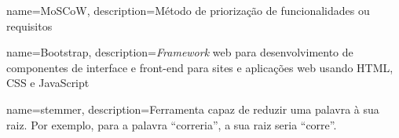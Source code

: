 
{
   name=MoSCoW,
   description={Método de priorização de funcionalidades ou requisitos }
}

{
    name=Bootstrap,
    description={\textit{Framework} web para desenvolvimento de componentes de interface e front-end para sites e aplicações web usando HTML, CSS e JavaScript }
}


{
    name=stemmer,
    description={Ferramenta capaz de reduzir uma palavra à sua raiz. Por exemplo, para a palavra ``correria'', a sua raiz seria ``corre''. }
 }
